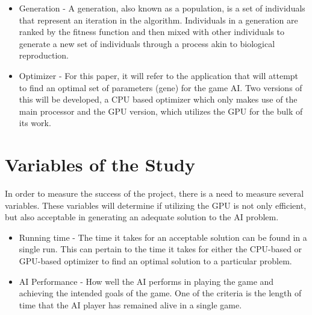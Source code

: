 \begin{itemize}
 \item Generation - A generation, also known as a population, is a set of individuals that represent
an iteration in the algorithm. Individuals in a generation are ranked by the fitness function and then
mixed with other individuals to generate a new set of individuals through a process akin to biological
reproduction.

  \item Optimizer - For this paper, it will refer to the application that will attempt to find an
optimal set of parameters (gene) for the game AI. Two versions of this will be developed, a CPU
based optimizer which only makes use of the main processor and the GPU version, which utilizes
the GPU for the bulk of its work.

\end{itemize}

\section{Variables of the Study}

In order to measure the success of the project, there is a need to measure several variables. These
variables will determine if utilizing the GPU is not only efficient, but also acceptable in generating
an adequate solution to the AI problem.

\begin{itemize}
 \item Running time - The time it takes for an acceptable solution can be found in a single run.
This can pertain to the time it takes for either the CPU-based or GPU-based optimizer to find an
optimal solution to a particular problem.

 \item AI Performance - How well the AI performs in playing the game and achieving the intended goals
of the game. One of the criteria is the length of time that the AI player has remained alive in a single
game.
\end{itemize}